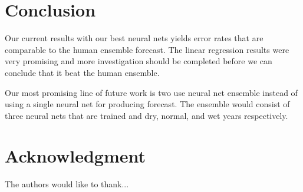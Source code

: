 \documentclass[conference]{IEEEtran}
\begin{document}
\section{Conclusion}
Our current results with our best neural nets yields error rates that are
comparable to the human ensemble forecast. The linear regression results
were very promising and more investigation should be completed before we can
conclude that it beat the human ensemble.

Our most promising line of future work is two use neural net ensemble instead of
using a single neural net for producing forecast. The ensemble would consist of
three neural nets that are trained and dry, normal, and wet years respectively.






\section*{Acknowledgment}


The authors would like to thank...







%
%
%




\end{document}
